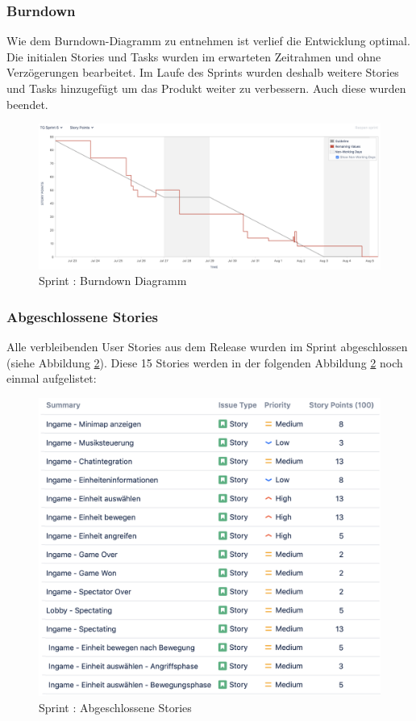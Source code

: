 \documentclass[12pt, titlepage]{scrartcl}
\newcommand{\RN}[1]{%
	\textup{\uppercase\expandafter{\romannumeral#1}}%
}
\begin{document}
	    	\subsubsection{Burndown}
	    		Wie dem Burndown-Diagramm zu entnehmen ist verlief die Entwicklung optimal. Die initialen Stories und Tasks wurden im erwarteten Zeitrahmen und ohne Verz\"ogerungen bearbeitet. Im Laufe des Sprints wurden deshalb weitere Stories und Tasks hinzugef\"ugt um das Produkt weiter zu verbessern. Auch diese wurden beendet.
	    		\begin{figure}[H] 
	    			\centering
	    			\includegraphics[width=\textwidth]{images/sprintVI/burndown.png}
	    			\caption{Sprint \RN{6}: Burndown Diagramm}
	    			\label{Burndown_6}
	    		\end{figure}
	    	\subsubsection{Abgeschlossene Stories}
	    		Alle verbleibenden User Stories aus dem Release \RN{3} wurden im Sprint \RN{6} abgeschlossen (siehe Abbildung \ref{Done_Stories_6}). Diese 15 Stories werden in der folgenden Abbildung \ref{Done_Stories_6} noch einmal aufgelistet:
	    		\begin{figure}[H]
	    			\centering
	    			\includegraphics[width=\textwidth]{images/sprintVI/doneStories.png}
	    			\caption{Sprint \RN{6}: Abgeschlossene Stories}
	    			\label{Done_Stories_6}
	    		\end{figure}
\end{document}
